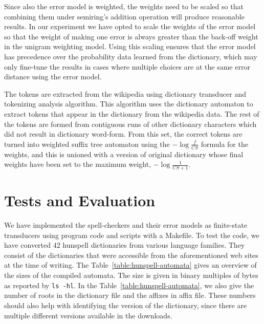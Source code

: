 \documentclass[postprint]{flammie}
\begin{document}
Since also the error model is weighted, the
weights need to be scaled so that combining them under semiring's addition
operation will produce reasonable results. In our experiment we have opted to
scale the weights of the error model so that the weight of making one error is
always greater than the back-off weight in the unigram weighting model. Using
this scaling ensures that the error model has precedence over the probability
data learned from the dictionary, which may only fine-tune the results in cases
where multiple choices are at the same error distance using the error model.

The tokens are extracted from the wikipedia using dictionary transducer and
tokenizing analysis algorithm\cite{garrido-alenda/2002}. This algorithm uses
the dictionary automaton to extract tokens that appear in the dictionary from
the wikipedia data. The rest of the tokens are formed from contiguous runs of
other dictionary characters which did not result in dictionary word-form. From
this set, the correct tokens are turned into weighted suffix tree automaton
using the $-\log\frac{f}{CS}$ formula for the weights, and this is unioned with
a version of original dictionary whose final weights have been set to the
maximum weight, $-\log\frac{1}{CS+1}$.

\section{Tests and Evaluation}

We have implemented the spell-checkers and their error models as finite-state
transducers using program code and scripts with a Makefile.  To test the code,
we have converted 42 hunspell dictionaries from various language families. They
consist of the dictionaries that were accessible from the aforementioned web
sites at the time of writing. The Table~\ref{table:hunspell-automata} gives an
overview of the sizes of the compiled automata. The size is given in binary
multiples of bytes as reported by \texttt{ls -hl}.  In the
Table~\ref{table:hunspell-automata}, we also give the number of roots in the
dictionary file and the affixes in affix file. These numbers should also help
with identifying the version of the dictionary, since there are multiple
different versions available in the downloads.
\end{document}
